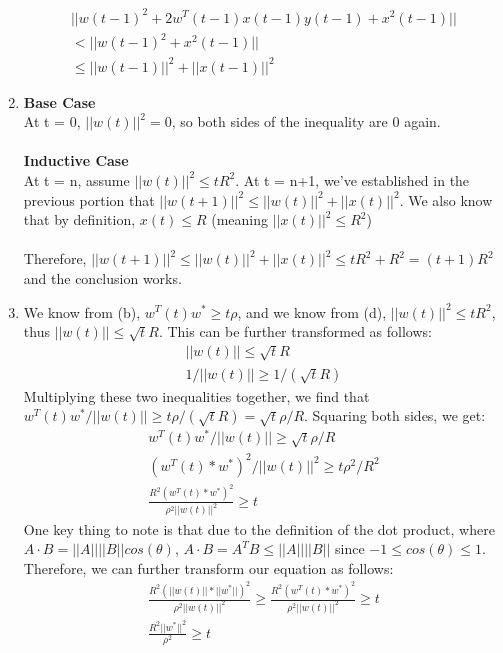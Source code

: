 \documentclass[12pt]{article}
\begin{document}
\begin{enumerate}[label=(\alph*)]
	\begin{gather*}
		||w(t-1)^2 + 2w^T(t-1)x(t-1)y(t-1) + x^2(t-1)||
		\\ < ||w(t-1)^2 + x^2(t-1)||
		\\ \le ||w(t-1)||^2 + ||x(t-1)||^2
	\end{gather*}
	\item \textbf{Base Case}
	\\ At t = 0, $||w(t)||^2 = 0$, so both sides of the inequality are 0 again.
	\\ \\ \textbf{Inductive Case}
	\\ At t = n, assume $||w(t)||^2 \le tR^2$. At t = n+1, we've established in the previous portion that $||w(t+1)||^2 \le ||w(t)||^2 + ||x(t)||^2$. We also know that by definition, $x(t) \le R$ (meaning $||x(t)||^2 \le R^2$)
	\\ \\ Therefore, $||w(t+1)||^2 \le ||w(t)||^2 + ||x(t)||^2 \le tR^2 + R^2 = (t+1)R^2$ and the conclusion works.
	\item We know from (b), $w^T(t)w^* \ge t\rho$, and we know from (d), $||w(t)||^2 \le tR^2$, thus $||w(t)|| \le \sqrt{t}R$. This can be further transformed as follows:
	\begin{gather*}
		||w(t)|| \le \sqrt{t}R
		\\ 1/||w(t)|| \ge 1/(\sqrt{t}R)
	\end{gather*}
	Multiplying these two inequalities together, we find that $w^T(t)w^*/||w(t)|| \ge t\rho/(\sqrt{t}R) = \sqrt{t}\rho/R$. Squaring both sides, we get:
	\begin{gather*}
		w^T(t)w^*/||w(t)|| \ge \sqrt{t}\rho/R
		\\ (w^T(t) * w^*)^2/||w(t)||^2 \ge t\rho^2/R^2
		\\ \frac{R^2(w^T(t) * w^*)^2}{\rho^2||w(t)||^2} \ge t
	\end{gather*}
	One key thing to note is that due to the definition of the dot product, where $A \cdot B = ||A|| ||B|| cos(\theta)$, $A \cdot B = A^T B \le ||A|| ||B||$ since $-1 \le cos(\theta) \le 1$. Therefore, we can further transform our equation as follows:
	\begin{gather*}
		\frac{R^2(||w(t)||*||w^*||)^2}{\rho^2||w(t)||^2} \ge \frac{R^2(w^T(t) * w^*)^2}{\rho^2||w(t)||^2} \ge t
		\\ \frac{R^2||w^*||^2}{\rho^2} \ge t
	\end{gather*}
\end{enumerate}
\end{document}
